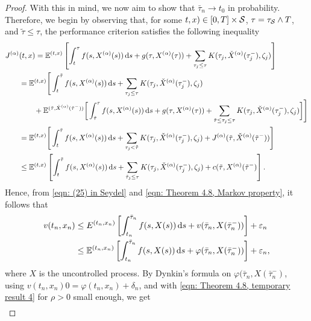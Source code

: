 \begin{proof}
    With this in mind, we now aim to show that $\bar \tau_n \rightarrow t_0$ in probability. Therefore, we begin by observing that, for some $t,x) \in [0,T] \times \mathcal{S}$, $\tau = \tau_{\mathcal{S}} \wedge T$, and $\tilde \tau \leq \tau$, the performance criterion satisfies the following inequality
    \begin{align}
        J^{(\alpha)}&(t,x) = \mathbb{E}^{(t,x)} \left[ \int_t^{\tau} f(s,X^{(\alpha)}(s)) \,\mathrm{d} s + g(\tau,X^{(\alpha)}(\tau)) + \sum_{\tau_j \leq \tau} K(\tau_j, \check{X}^{(\alpha)}(\tau_j^-), \zeta_j) \right] \nonumber \\
        &= \mathbb{E}^{(t,x)} \Bigg[ \int_t^{\tilde \tau} f(s,X^{(\alpha)}(s)) \,\mathrm{d} s + \sum_{\tau_j \leq \tau} K(\tau_j, \check{X}^{(\alpha)}(\tau_j^-), \zeta_j) \nonumber  \\
        & \qquad + \mathbb{E}^{(\tilde \tau, \check{X}^{(\alpha)}(\tilde \tau^-))}\bigg[ \int_{\tilde \tau}^{\tau} f(s,X^{(\alpha)}(s)) \,\mathrm{d} s + g(\tau, X^{(\alpha)}(\tau)) + \sum_{\tilde \tau \leq \tau_j \leq \tau} K(\tau_j, \check{X}^{(\alpha)}(\tau_j^-),\zeta_j) \bigg] \Bigg] \nonumber \\
        &= \mathbb{E}^{(t,x)} \Bigg[ \int_t^{\tilde \tau} f(s,X^{(\alpha)}(s)) \,\mathrm{d} s + \sum_{\tau_j < \tilde \tau} K(\tau_j, \check{X}^{(\alpha)}(\tau_j^-), \zeta_j) + J^{(\alpha)}(\tilde \tau, \check{X}^{(\alpha)}(\tilde \tau ^-)) \Bigg] \nonumber  \\
        & \leq \mathbb{E}^{(t,x)} \left[ \int_t^{\tilde \tau} f(s,X^{(\alpha)}(s)) \,\mathrm{d} s + \sum_{\tilde \tau_j \leq \tau} K(\tau_j, \check{X}^{(\alpha)}(\tau_j^-),\zeta_j) + c(\tilde \tau, X^{(\alpha)}(\tilde \tau^-) \right]
        \label{eqn: Theorem 4.8, Markov property}. 
    \end{align}
    Hence, from \eqref{eqn: (25) in Seydel} and \eqref{eqn: Theorem 4.8, Markov property}, it follows that
    \begin{align*}
        v(t_n,x_n) &\leq E^{(t_n,x_n)} \left[ \int_{t_n}^{\bar \tau_n} f(s,X(s)) \,\mathrm{d} s + v(\bar \tau_n, X(\bar \tau_n^-)) \right] + \varepsilon_n \\
        & \leq \mathbb{E}^{(t_n,x_n)} \left[ \int_{t_n}^{\bar \tau_n} f(s,X(s)) \,\mathrm{d} s + \varphi(\bar \tau_n, X(\bar \tau_n^-)) \right] + \varepsilon_n,
    \end{align*}
    where $X$ is the uncontrolled process. By Dynkin's formula on $\varphi(\bar \tau_n, X(\bar \tau_n^-)$, using $v(t_n,x_n) 0 = \varphi(t_n,x_n) + \delta_n$, and with \eqref{eqn: Theorem 4.8, temporary result 4} for $\rho>0$ small enough, we get
    \begin{align*}

\end{align*}
\end{proof}
